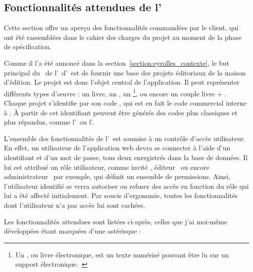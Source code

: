 \subsection{Fonctionnalités attendues de l'\aintranet}
\label{section:eyrolles_fct}

Cette section offre un aperçu des fonctionnalités commandées par le client, qui ont été rassemblées dans le cahier des charges du projet au moment de la phase de spécification.

Comme il l'a été annoncé dans la section~\ref{section:eyrolles_contexte}, le but principal du \alotdeux\ de l'\aintranet\ d'\aey\ est de fournir une base des projets éditoriaux de la maison d'édition. Le projet est donc l'objet central de l'application. Il peut représenter différents types d'œuvre : un livre, un \advd, un \aebook\footnote{Un \aebook, ou livre électronique, est un texte numérisé pouvant être lu sur un support électronique.~\cite{ebook}}, ou encore un couple livre + \aebook. Chaque projet s'identifie par son code \ageodif, qui est en fait le code commercial interne à \aey. À partir de cet identifiant peuvent être générés des codes plus classiques et plus répandus, comme l'\aisbn\ ou l'\aean.

L'ensemble des fonctionnalités de l'\aintranet\ est soumise à un contrôle d'accès utilisateur. En effet, un utilisateur de l'application web devra se connecter à l'aide d'un identifiant et d'un mot de passe, tous deux enregistrés dans la base de données. Il lui est attribué un rôle utilisateur, comme \og invité \fg, \og éditeur \fg\ ou encore \og administrateur \fg\ par exemple, qui définit un ensemble de permissions. Ainsi, l'utilisateur identifié se verra autoriser ou refuser des accès en fonction du rôle qui lui a été affecté initialement. Par soucis d'ergonomie, toutes les fonctionnalités dont l'utilisateur n'a pas accès lui sont cachées.

Les fonctionnalités attendues sont listées ci-après, celles que j'ai moi-même développées étant marquées d'une astérisque :

